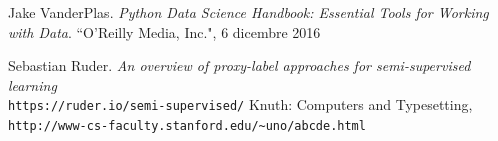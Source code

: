 \documentclass[12pt,italian]{report}
\begin{document}
\begin{thebibliography}{9}
 	Jake VanderPlas. 
 	\textit{Python Data Science Handbook: Essential Tools for Working with Data}. 
 	``O'Reilly Media, Inc.", 6 dicembre 2016

 	Sebastian Ruder. \textit{An overview of proxy-label approaches for semi-supervised learning}
 	\\\texttt{https://ruder.io/semi-supervised/}
	Knuth: Computers and Typesetting,
	\\\texttt{http://www-cs-faculty.stanford.edu/\~{}uno/abcde.html}
\end{thebibliography}
\end{document}
